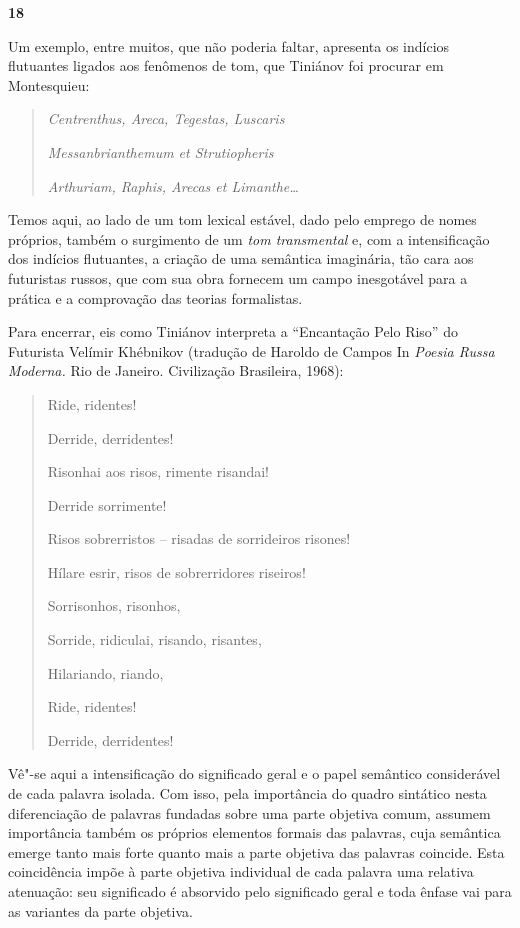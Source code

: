 \textbf{18}

Um exemplo, entre muitos, que não poderia faltar, apresenta os indícios
flutuantes ligados aos fenômenos de tom, que Tiniánov foi procurar em
Montesquieu:

\begin{quote}
\emph{Centrenthus, Areca, Tegestas, Luscaris}

\emph{Messanbrianthemum et Strutiopheris}

\emph{Arthuriam, Raphis, Arecas et Limanthe\ldots{}}
\end{quote}

Temos aqui, ao lado de um tom lexical estável, dado pelo emprego de
nomes próprios, também o surgimento de um \emph{tom transmental} e, com
a intensificação dos indícios flutuantes, a criação de uma semântica
imaginária, tão cara aos futuristas russos, que com sua obra fornecem um
campo inesgotável para a prática e a comprovação das teorias
formalistas.

Para encerrar, eis como Tiniánov interpreta a ``Encantação Pelo Riso''
do Futurista Velímir Khébnikov (tradução de Haroldo de Campos In
\emph{Poesia Russa Moderna.} Rio de Janeiro. Civilização Brasileira,
1968):

\begin{quote}
Ride, ridentes!

Derride, derridentes!

Risonhai aos risos, rimente risandai!

Derride sorrimente!

Risos sobrerristos -- risadas de sorrideiros risones!

Hílare esrir, risos de sobrerridores riseiros!

Sorrisonhos, risonhos,

Sorride, ridiculai, risando, risantes,

Hilariando, riando,

Ride, ridentes!

Derride, derridentes!
\end{quote}

Vê"-se aqui a intensificação do significado geral e o papel semântico
considerável de cada palavra isolada. Com isso, pela importância do
quadro sintático nesta diferenciação de palavras fundadas sobre uma
parte objetiva comum, assumem importância também os próprios elementos
formais das palavras, cuja semântica emerge tanto mais forte quanto mais
a parte objetiva das palavras coincide. Esta coincidência impõe à parte
objetiva individual de cada palavra uma relativa atenuação: seu
significado é absorvido pelo significado geral e toda ênfase vai para as
variantes da parte objetiva.

